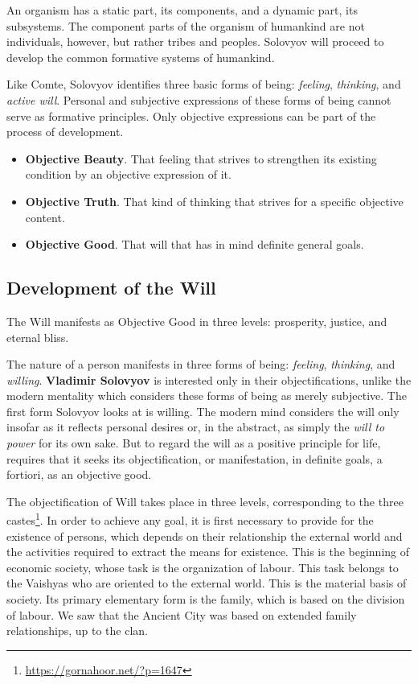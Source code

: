An organism has a static part, its components, and a dynamic part, its subsystems. The component parts of the organism of humankind are not individuals, however, but rather tribes and peoples. Solovyov will proceed to develop the common formative systems of humankind.

Like Comte, Solovyov identifies three basic forms of being: \emph{feeling}, \emph{thinking}, and \emph{active will}. Personal and subjective expressions of these forms of being cannot serve as formative principles. Only objective expressions can be part of the process of development.

\begin{itemize}
\item \textbf{Objective Beauty}. That feeling that strives to strengthen its existing condition by an objective expression of it. 
\item \textbf{Objective Truth}. That kind of thinking that strives for a specific objective content. 
\item \textbf{Objective Good}. That will that has in mind definite general goals. 
\end{itemize}

\subsection{Development of the Will}

\begin{quotex}
The Will manifests as Objective Good in three levels: prosperity, justice, and eternal bliss.
\end{quotex}

The nature of a person manifests in three forms of being: \emph{feeling}, \emph{thinking}, and \emph{willing}. \textbf{Vladimir Solovyov} is interested only in their objectifications, unlike the modern mentality which considers these forms of being as merely subjective. The first form Solovyov looks at is willing. The modern mind considers the will only insofar as it reflects personal desires or, in the abstract, as simply the \emph{will to power} for its own sake. But to regard the will as a positive principle for life, requires that it seeks its objectification, or manifestation, in definite goals, a fortiori, as an objective good.

The objectification of Will takes place in three levels, corresponding to the three castes\footnote{\url{https://gornahoor.net/?p=1647}}. In order to achieve any goal, it is first necessary to provide for the existence of persons, which depends on their relationship the external world and the activities required to extract the means for existence. This is the beginning of economic society, whose task is the organization of labour. This task belongs to the Vaishyas who are oriented to the external world. This is the material basis of society. Its primary elementary form is the family, which is based on the division of labour. We saw that the Ancient City was based on extended family relationships, up to the clan.

